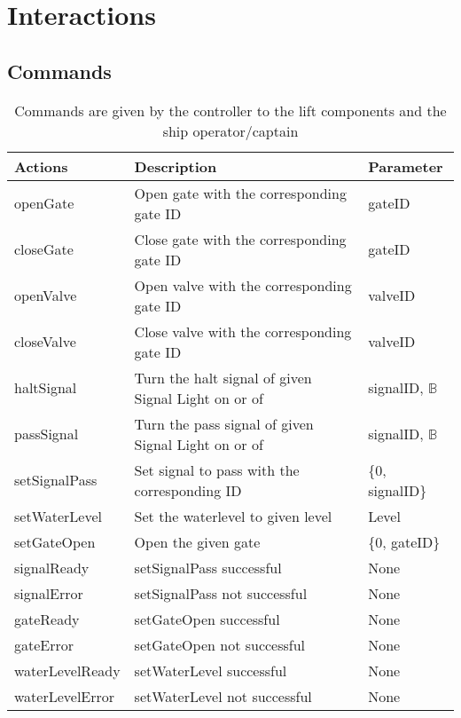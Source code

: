 \section{Interactions}

\subsection{Commands}
\begin{table}[htbp]
	\centering
	\caption{Commands are given by the controller to the lift components and the ship operator/captain}
	\begin{tabular}{lll}
		\toprule
		\textbf{Actions} & \textbf{Description} & \textbf{Parameter} \\
		\midrule
		openGate & Open gate with the corresponding gate ID & gateID \\
		closeGate & Close gate with the corresponding gate ID & gateID \\
		openValve & Open valve with the corresponding gate ID & valveID \\
		closeValve & Close valve with the corresponding gate ID & valveID \\
		haltSignal & Turn the halt signal of given Signal Light on or of & signalID, $\mathbb{B}$\\
		passSignal & Turn the pass signal of given Signal Light on or of & signalID, $\mathbb{B}$\\
		setSignalPass & Set signal to pass with the corresponding ID  & \{0, signalID\} \\
		setWaterLevel & Set the waterlevel to given level & Level\\
		setGateOpen & Open the given gate & \{0, gateID\} \\
		signalReady & setSignalPass successful & None\\
		signalError & setSignalPass not successful & None \\
		gateReady & setGateOpen successful & None\\
		gateError & setGateOpen not successful & None\\
		waterLevelReady & setWaterLevel successful & None\\
		waterLevelError & setWaterLevel not successful & None\\
		\bottomrule
		\end{tabular}%
		\label{tab:addlabel}%
		\end{table}%
		
